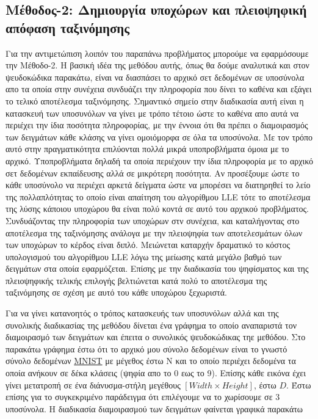 \subsection{Μέθοδος-2: Δημιουργία υποχώρων και πλειοψηφική απόφαση ταξινόμησης }
\par
Για την αντιμετώπιση λοιπόν του παραπάνω προβλήματος μπορούμε να εφαρμόσουμε την Μέθοδο-2. Η βασική ιδέα της μεθόδου αυτής, όπως θα δούμε αναλυτικά και στον ψευδοκώδικα παρακάτω, είναι να διασπάσει το αρχικό σετ δεδομένων σε υποσύνολα απο τα οποία στην συνέχεια συνδυάζει την πληροφορία που δίνει το καθένα και εξάγει το τελικό αποτέλεσμα ταξινόμησης. Σημαντικό σημείο στην διαδικασία αυτή είναι η κατασκευή των υποσυνόλων να γίνει με τρόπο τέτοιο ώστε το καθένα απο αυτά να περιέχει την ίδια ποσότητα πληροφορίας, με την έννοια ότι θα πρέπει ο διαμοιρασμός των δειγμάτων κάθε κλάσης να γίνει ομοιόμορφα σε όλα τα υποσύνολα. Με τον τρόπο αυτό στην πραγματικότητα επιλύονται πολλά μικρά υποπροβλήματα όμοια με το αρχικό. Υποπροβλήματα δηλαδή τα οποία περιέχουν την ίδια πληροφορία με το αρχικό σετ δεδομένων εκπαίδευσης αλλά σε μικρότερη ποσότητα. Αν προσέξουμε ώστε το κάθε υποσύνολο να περιέχει αρκετά δείγματα ώστε να μπορέσει να διατηρηθεί το λείο της πολλαπλότητας το οποίο είναι απαίτηση του αλγορίθμου \textlatin{LLE} τότε το αποτέλεσμα της λύσης κάποιου υποχώρου θα είναι πολύ κοντά σε αυτό του αρχικού προβλήματος. Συνδυάζοντας την πληροφορία των υποχώρων στν συνέχεια, και καταλήγοντας στο αποτέλεσμα της ταξινόμησης ανάλογα με την πλειοψηφία των αποτελεσμάτων όλων των υποχώρων το κέρδος είναι διπλό. Μειώνεται καταρχήν δραματικό το κόστος υπολογισμού του αλγορίθμου \textlatin{LLE} λόγω της μείωσης κατά μεγάλο βαθμό των δειγμάτων στα οποία εφαρμόζεται. Επίσης με την διαδικασία του ψηφίσματος και της πλειοψηφικής τελικής επιλογής βελτιώνεται κατά πολύ το αποτέλεσμα της ταξινόμησης σε σχέση με αυτό του κάθε υποχώρου ξεχωριστά. 
\par
Για να γίνει κατανοητός ο τρόπος κατασκευής των υποσυνόλων αλλά και της συνολικής διαδικασίας της μεθόδου δίνεται ένα γράφημα το οποίο αναπαριστά τον διαμοιρασμό των δειγμάτων και έπειτα ο συνολικός ψευδοκώδικας τηε μεθόδου. Στο παρακάτω γράφημα έστω ότι το αρχικό μου σύνολο δεδομένων είναι το γνωστό σύνολο δεδομένων \href{http://yann.lecun.com/exdb/mnist/}{\textlatin{MNIST}} με μέγεθος έστω \textlatin{N} και το οποίο περιέχει δεδομένα τα οποία ανήκουν σε δέκα κλάσεις (ψηφία απο το 0 εως το 9). Επίσης κάθε εικόνα έχει γίνει μετατροπή σε ένα διάνυσμα-στήλη μεγέθους $[Width \times Height]$, έστω $D$. Έστω επίσης για το συγκεκριμένο παράδειγμα ότι επιλέγουμε να το χωρίσουμε σε 3 υποσύνολα. Η διαδικασία διαμοιρασμού των δειγμάτων φαίνεται γραφικά παρακάτω
